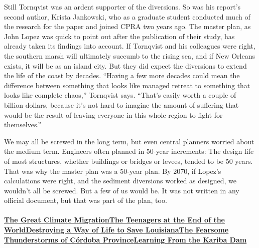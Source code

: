 Still Tornqvist was an ardent supporter of the diversions. So was his
report's second author, Krista Jankowski, who as a graduate student
conducted much of the research for the paper and joined CPRA two years
ago. The master plan, as John Lopez was quick to point out after the
publication of their study, has already taken its findings into account.
If Tornqvist and his colleagues were right, the southern marsh will
ultimately succumb to the rising sea, and if New Orleans exists, it will
be as an island city. But they did expect the diversions to extend the
life of the coast by decades. ``Having a few more decades could mean the
difference between something that looks like managed retreat to
something that looks like complete chaos,'' Tornqvist says. ``That's
easily worth a couple of billion dollars, because it's not hard to
imagine the amount of suffering that would be the result of leaving
everyone in this whole region to fight for themselves.''

We may all be screwed in the long term, but even central planners
worried about the medium term. Engineers often planned in 50-year
increments: The design life of most structures, whether buildings or
bridges or levees, tended to be 50 years. That was why the master plan
was a 50-year plan. By 2070, if Lopez's calculations were right, and the
sediment diversions worked as designed, we wouldn't all be screwed. But
a few of us would be. It was not written in any official document, but
that was part of the plan, too.

\hypertarget{the-great-climate-migrationthe-teenagers-at-the-end-of-the-worlddestroying-a-way-of-life-to-save-louisianathe-fearsome-thunderstorms-of-cuxf3rdoba-provincelearning-from-the-kariba-dam}{%
\paragraph{\texorpdfstring{\href{https://www.nytimes3xbfgragh.onion/interactive/2020/07/23/magazine/climate-migration.html}{The
Great Climate
Migration}\href{https://www.nytimes3xbfgragh.onion/interactive/2020/07/21/magazine/teenage-activist-climate-change.html}{The
Teenagers at the End of the
World}\href{https://www.nytimes3xbfgragh.onion/interactive/2020/07/21/magazine/louisiana-coast-engineering.html}{Destroying
a Way of Life to Save
Louisiana}\href{https://www.nytimes3xbfgragh.onion/interactive/2020/07/22/magazine/worst-storms-argentina.html}{The
Fearsome Thunderstorms of Córdoba
Province}\href{https://www.nytimes3xbfgragh.onion/interactive/2020/07/22/magazine/zambia-kariba-dam.html}{Learning
From the Kariba
Dam}}{The Great Climate MigrationThe Teenagers at the End of the WorldDestroying a Way of Life to Save LouisianaThe Fearsome Thunderstorms of Córdoba ProvinceLearning From the Kariba Dam}}\label{the-great-climate-migrationthe-teenagers-at-the-end-of-the-worlddestroying-a-way-of-life-to-save-louisianathe-fearsome-thunderstorms-of-cuxf3rdoba-provincelearning-from-the-kariba-dam}}

